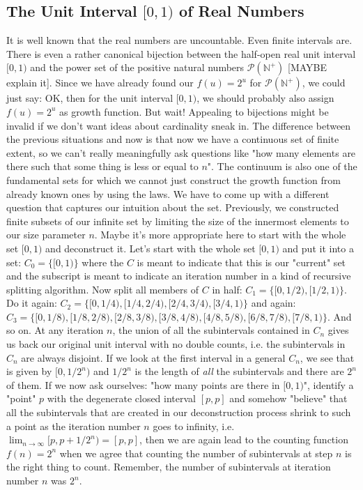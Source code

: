 \documentclass[12pt]{article}
\begin{document}
\subsection{The Unit Interval $[0,1)$ of Real Numbers}
It is well known that the real numbers are uncountable. Even finite intervals are. There is even a rather canonical bijection between the half-open real unit interval $[0,1)$ and the power set of the positive natural numbers $\mathcal{P}(\mathbb{N}^+)$ [MAYBE explain it]. Since we have already found our $f(u) = 2^u$ for $\mathcal{P}(\mathbb{N}^+)$, we could just say: OK, then for the unit interval $[0,1)$, we should probably also assign $f(u) = 2^u$ as growth function. But wait! Appealing to bijections might be invalid if we don't want ideas about cardinality sneak in. The difference between the previous situations and now is that now we have a continuous set of finite extent, so we can't really meaningfully ask questions like "how many elements are there such that some thing is less or equal to $n$". The continuum is also one of the fundamental sets for which we cannot just construct the growth function from already known ones by using the laws. We have to come up with a different question that captures our intuition about the set. Previously, we constructed finite subsets of our infinite set by limiting the size of the innermost elements to our size parameter $n$. Maybe it's more appropriate here to start with the whole set $[0,1)$ and deconstruct it. Let's start with the whole set $[0,1)$ and put it into a set: $C_0 = \{[0,1)\}$ where the $C$ is meant to indicate that this is our "current" set and the subscript is meant to indicate an iteration number in a kind of recursive splitting algorithm. Now split all members of $C$ in half: $C_1 = \{[0,1/2), [1/2,1)\}$. Do it again: $C_2 = \{[0,1/4), [1/4,2/4), [2/4,3/4), [3/4,1)\}$ and again: $C_3 = \{[0,1/8), [1/8,2/8), [2/8,3/8), [3/8,4/8), [4/8,5/8), [6/8,7/8), [7/8,1)\}$. And so on. At any iteration $n$, the union of all the subintervals contained in $C_n$ gives us back our original unit interval with no double counts, i.e. the subintervals in $C_n$ are always disjoint. If we look at the first interval in a general $C_n$, we see that is given by $[0,1/2^n)$ and $1/2^n$ is the length of \emph{all} the subintervals and there are $2^n$ of them. If we now ask ourselves: "how many points are there in $[0,1)$", identify a "point" $p$ with the degenerate closed interval $[p,p]$ and somehow "believe" that all the subintervals that are created in our deconstruction process shrink to such a point as the iteration number $n$ goes to infinity, i.e. $\lim_{n \rightarrow \infty} [p,p + 1/2^n) = [p,p]$, then we are again lead to the counting function $f(n) = 2^n$ when we agree that counting the number of subintervals at step $n$ is the right thing to count. Remember, the number of subintervals at iteration number $n$ was $2^n$. 
\end{document}
